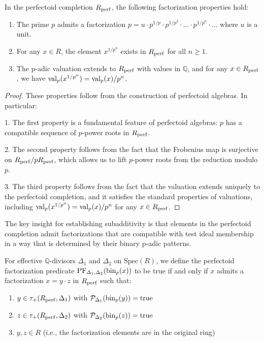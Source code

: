 \begin{proposition}\label{prop:basic-perfectoid-factorizations}
In the perfectoid completion $R_{\operatorname{perf}}$, the following factorization properties hold:
\begin{enumerate}
    \item The prime $p$ admits a factorization $p = u \cdot p^{1/p} \cdot p^{1/p^2} \cdot \ldots \cdot p^{1/p^n} \cdot \ldots$ where $u$ is a unit.
    \item For any $x \in R$, the element $x^{1/p^n}$ exists in $R_{\operatorname{perf}}$ for all $n \geq 1$.
    \item The p-adic valuation extends to $R_{\operatorname{perf}}$ with values in $\mathbb{Q}$, and for any $x \in R_{\operatorname{perf}}$, we have $\operatorname{val}_p(x^{1/p^n}) = \operatorname{val}_p(x)/p^n$.
\end{enumerate}
\end{proposition}

\begin{proof}
These properties follow from the construction of perfectoid algebras. In particular:

1. The first property is a fundamental feature of perfectoid algebras: $p$ has a compatible sequence of $p$-power roots in $R_{\operatorname{perf}}$.

2. The second property follows from the fact that the Frobenius map is surjective on $R_{\operatorname{perf}}/p R_{\operatorname{perf}}$, which allows us to lift $p$-power roots from the reduction modulo $p$.

3. The third property follows from the fact that the valuation extends uniquely to the perfectoid completion, and it satisfies the standard properties of valuations, including $\operatorname{val}_p(x^{1/p^n}) = \operatorname{val}_p(x)/p^n$ for any $x \in R_{\operatorname{perf}}$.
\end{proof}

The key insight for establishing subadditivity is that elements in the perfectoid completion admit factorizations that are compatible with test ideal membership in a way that is determined by their binary p-adic patterns.

\begin{definition}\label{def:perfectoid-factorization-predicate}
For effective $\mathbb{Q}$-divisors $\Delta_1$ and $\Delta_2$ on $\text{Spec}(R)$, we define the perfectoid factorization predicate $\text{PF}_{\Delta_1, \Delta_2}(\operatorname{bin}_p(x))$ to be true if and only if $x$ admits a factorization $x = y \cdot z$ in $R_{\operatorname{perf}}$ such that:
\begin{enumerate}
    \item $y \in \tau_+(R_{\operatorname{perf}},\Delta_1)$ with $\mathcal{P}_{\Delta_1}(\operatorname{bin}_p(y)) = \text{true}$
    \item $z \in \tau_+(R_{\operatorname{perf}},\Delta_2)$ with $\mathcal{P}_{\Delta_2}(\operatorname{bin}_p(z)) = \text{true}$
    \item $y, z \in R$ (i.e., the factorization elements are in the original ring)
\end{enumerate}
\end{definition}

